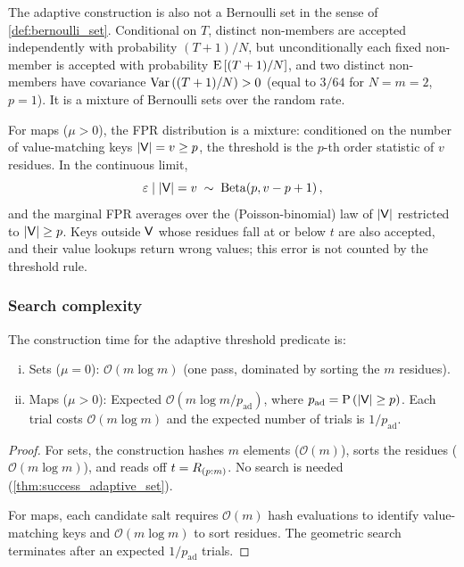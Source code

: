 The adaptive construction is also not a Bernoulli set in the sense of
\cref{def:bernoulli_set}.
Conditional on $T$, distinct non-members are accepted independently with
probability $(T+1)/N$, but unconditionally each fixed non-member is accepted
with probability $\Expect{(T+1)/N}$, and two distinct non-members have
covariance $\Var{(T+1)/N} > 0$ (equal to $3/64$ for $N = m = 2$, $p = 1$).
It is a mixture of Bernoulli sets over the random rate.

\begin{remark}
For maps ($\mu > 0$), the FPR distribution is a mixture: conditioned on the
number of value-matching keys $\Card{\Set{V}} = v \geq p$, the threshold is the
$p$-th order statistic of $v$ residues.
In the continuous limit,
\begin{equation}
    \fprate \mid \Card{\Set{V}} = v \;\sim\; \betadist(p, v - p + 1)\,,
\end{equation}
and the marginal FPR averages over the (Poisson-binomial) law of
$\Card{\Set{V}}$ restricted to $\Card{\Set{V}} \geq p$.
Keys outside $\Set{V}$ whose residues fall at or below $t$ are also accepted,
and their value lookups return wrong values; this error is not counted by the
threshold rule.
\end{remark}

\subsubsection{Search complexity}

\begin{theorem}
\label{thm:adaptive_complexity}
The construction time for the adaptive threshold predicate is:
\begin{enumerate}[(i)]
    \item Sets ($\mu = 0$): $\mathcal{O}(m \log m)$ (one pass, dominated by
    sorting the $m$ residues).
    \item Maps ($\mu > 0$): Expected $\mathcal{O}(m \log m / p_{\mathrm{ad}})$,
    where $p_{\mathrm{ad}} = \Prob{\Card{\Set{V}} \geq p}$.
    Each trial costs $\mathcal{O}(m \log m)$ and the expected number of trials
    is $1 / p_{\mathrm{ad}}$.
\end{enumerate}
\end{theorem}
\begin{proof}
For sets, the construction hashes $m$ elements ($\mathcal{O}(m)$), sorts the
residues ($\mathcal{O}(m \log m)$), and reads off $t = R_{(p:m)}$.
No search is needed (\cref{thm:success_adaptive_set}).

For maps, each candidate salt requires $\mathcal{O}(m)$ hash evaluations to
identify value-matching keys and $\mathcal{O}(m \log m)$ to sort residues.
The geometric search terminates after an expected $1/p_{\mathrm{ad}}$ trials.
\end{proof}

